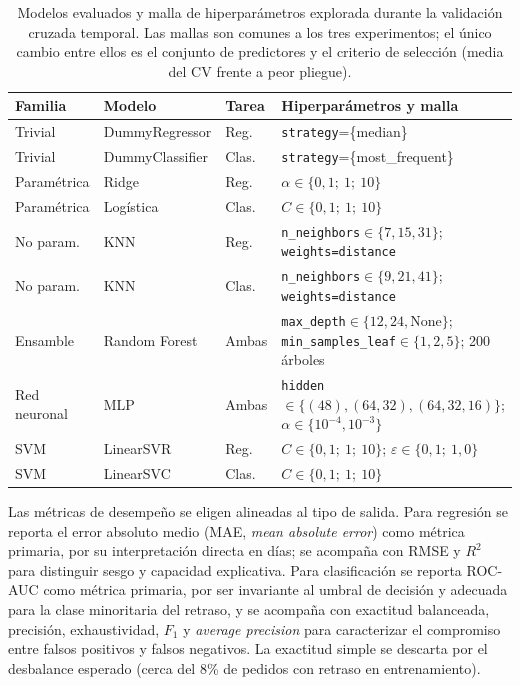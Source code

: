 \documentclass[journal]{IEEEtran}
\begin{document}
\begin{table}[t]
\caption{Modelos evaluados y malla de hiperparámetros explorada durante la validación cruzada temporal. Las mallas son comunes a los tres experimentos; el único cambio entre ellos es el conjunto de predictores y el criterio de selección (media del CV frente a peor pliegue).}
\label{tab:hiperparametros}
\centering\scriptsize
\setlength{\tabcolsep}{3pt}
\begin{tabular}{@{}p{1.2cm}p{1.95cm}p{0.65cm}p{3.5cm}@{}}
\toprule
Familia & Modelo & Tarea & Hiperparámetros y malla \\
\midrule
Trivial & DummyRegressor & Reg. & \texttt{strategy}=\{median\} \\
Trivial & DummyClassifier & Clas. & \texttt{strategy}=\{most\_frequent\} \\
Paramétrica & Ridge & Reg. & $\alpha\in\{0{,}1;\ 1;\ 10\}$ \\
Paramétrica & Logística & Clas. & $C\in\{0{,}1;\ 1;\ 10\}$ \\
No param. & KNN & Reg. & \texttt{n\_neighbors}$\in\{7,15,31\}$; \texttt{weights=distance} \\
No param. & KNN & Clas. & \texttt{n\_neighbors}$\in\{9,21,41\}$; \texttt{weights=distance} \\
Ensamble & Random Forest & Ambas & \texttt{max\_depth}$\in\{12,24,\text{None}\}$; \texttt{min\_samples\_leaf}$\in\{1,2,5\}$; 200 árboles \\
Red neuronal & MLP & Ambas & \texttt{hidden}$\in\{(48), (64{,}32), (64{,}32{,}16)\}$; $\alpha\in\{10^{-4},10^{-3}\}$ \\
SVM & LinearSVR & Reg. & $C\in\{0{,}1;\ 1;\ 10\}$; $\varepsilon\in\{0{,}1;\ 1{,}0\}$ \\
SVM & LinearSVC & Clas. & $C\in\{0{,}1;\ 1;\ 10\}$ \\
\bottomrule
\end{tabular}
\end{table}

Las métricas de desempeño se eligen alineadas al tipo de salida. Para regresión se reporta el error absoluto medio (MAE, \textit{mean absolute error}) como métrica primaria, por su interpretación directa en días; se acompaña con RMSE y $R^2$ para distinguir sesgo y capacidad explicativa. Para clasificación se reporta ROC-AUC como métrica primaria, por ser invariante al umbral de decisión y adecuada para la clase minoritaria del retraso, y se acompaña con exactitud balanceada, precisión, exhaustividad, $F_1$ y \textit{average precision} para caracterizar el compromiso entre falsos positivos y falsos negativos. La exactitud simple se descarta por el desbalance esperado (cerca del 8\% de pedidos con retraso en entrenamiento).
\end{document}
